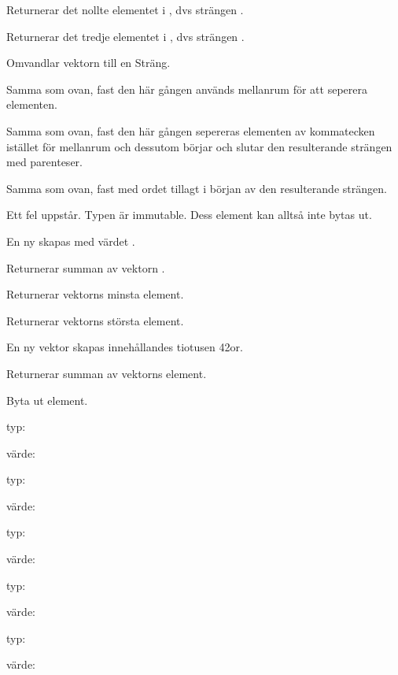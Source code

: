 \Subtask Returnerar det nollte elementet i , dvs strängen .

\Subtask Returnerar det tredje elementet i , dvs strängen \code{!}.

\Subtask Omvandlar vektorn till en Sträng.

\Subtask Samma som ovan, fast den här gången används mellanrum för att seperera elementen.

\Subtask Samma som ovan, fast den här gången sepereras elementen av kommatecken istället för mellanrum och dessutom börjar och slutar den resulterande strängen med parenteser.

\Subtask Samma som ovan, fast med ordet  tillagt i början av den resulterande strängen.

\Subtask Ett fel uppstår. Typen  är immutable. Dess element kan alltså inte bytas ut.

\Subtask En ny  skapas med värdet . 

\Subtask Returnerar summan av vektorn .

\Subtask Returnerar vektorns minsta element.

\Subtask Returnerar vektorns största element. 

\Subtask En ny vektor skapas innehållandes tiotusen 42or.

\Subtask Returnerar summan av vektorns element.

\Subtask Byta ut element.

\Task 

\Subtask typ: 

värde: 

\Subtask typ: 

värde: 

\Subtask typ: 

värde: 

\Subtask typ: 

värde: 

\Subtask typ: 

värde: 

